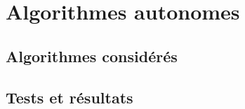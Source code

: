 \documentclass[a4paper,10pt]{report}
\begin{document}
\chapter{Algorithmes autonomes}
\section{Algorithmes considérés}


\section{Tests et résultats}
\end{document}
